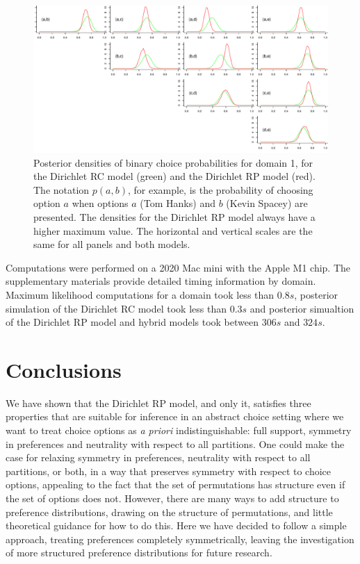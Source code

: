 \documentclass[11pt,letter]{article}
\newcommand{\Dpi}{Dirichlet RP model}
\newcommand{\DP}{Dirichlet RC model}
\begin{document}
\begin{figure}
  \centering
  \includegraphics[width=\textwidth]{figures/bin_plots.pdf}
  \caption{Posterior densities of binary choice probabilities for domain 1, for the \DP{} (green) and the \Dpi{} (red). The notation $p(a,b)$, for example, is the probability of choosing option $a$ when options $a$ (Tom Hanks) and $b$ (Kevin Spacey) are presented. The densities for the \Dpi{} always have a higher maximum value. The horizontal and vertical scales are the same for all panels and both models.}
  \label{f:bin_plots}
\end{figure}

Computations were performed on a 2020 Mac mini with the Apple M1 chip.
The supplementary materials provide detailed timing information by domain.
Maximum likelihood computations for a domain took less than $0.8s$, posterior simulation of the \DP{} took less than $0.3s$ and posterior simualtion of the \Dpi{} and hybrid models took between $306s$ and $324s$.

\section{Conclusions}

We have shown that the \Dpi{}, and only it, satisfies three properties that are suitable for inference in an abstract choice setting where we want to treat choice options as {\em a priori} indistinguishable: full support, symmetry in preferences and neutrality with respect to all partitions.
One could make the case for relaxing symmetry in preferences, neutrality with respect to all partitions, or both, in a way that preserves symmetry with respect to choice options, appealing to the fact that the set of permutations has structure even if the set of options does not.
However, there are many ways to add structure to preference distributions, drawing on the structure of permutations, and little theoretical guidance for how to do this.
Here we have decided to follow a simple approach, treating preferences completely symmetrically, leaving the investigation of more structured preference distributions for future research.
\end{document}
